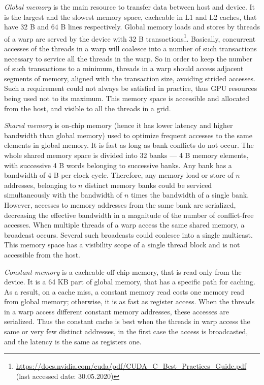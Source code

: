 \emph{Global memory} is the main resource to transfer data between host and 
device. It is the largest and the slowest memory space, cacheable in L1 and L2 
caches, that have 32 B and 64 B lines respectively.
Global memory loads and stores by threads of a warp are served by the device 
with 32 B transactions\footnote{\url{https://docs.nvidia.com/cuda/pdf/CUDA\_C\_Best\_Practices\_Guide.pdf} 
(last accessed date: 30.05.2020)}.
Basically, concurrent accesses of the threads in a warp will coalesce into a 
number of such transactions necessary to service all the threads in the warp.
So in order to keep the number of such transactions to a minimum, threads in 
a warp should access adjacent segments of memory, aligned with the transaction 
size, avoiding strided accesses.
Such a requirement could not always be satisfied in practice, thus GPU 
resources being used not to its maximum. This memory space is accessible and 
allocated from the host, and visible to all the threads in a grid. 

\emph{Shared memory} is on-chip memory (hence it has lower latency and higher 
bandwidth than global memory) used to optimize frequent accesses to the same 
elements in global memory.
It is fast as long as bank conflicts do not occur.
The whole shared memory space is divided into 32 banks --- 4 B memory elements, 
with successive 4 B words belonging to successive banks. 
Any bank has a bandwidth of 4 B per clock cycle.
Therefore, any memory load or store of $n$ addresses, belonging to $n$ distinct 
memory banks
could be serviced simultaneously with the bandwidth of $n$ times the bandwidth 
of a single bank.
However, accesses to memory addresses from the same bank are serialized, 
decreasing the effective bandwidth in a magnitude of the number of conflict-free accesses. 
When multiple threads of a warp access the same shared memory, a broadcast occurs. Several 
such broadcasts could coalesce into a single multicast. This memory space has a visibility 
scope of a single thread block and is not accessible from the host.

\emph{Constant memory} is a cacheable off-chip memory, that is read-only from the device. 
It is a 64 KB part of global memory, that has a specific path for caching. As a result, 
on a cache miss, a constant memory read costs one memory read from global memory; otherwise, 
it is as fast as register access. When the threads in a warp access different constant memory addresses, 
these accesses are serialized.  Thus the constant cache is best when the threads in warp access the same 
or very few distinct addresses, in the first case the access is broadcasted, and the latency is the same 
as registers one.

